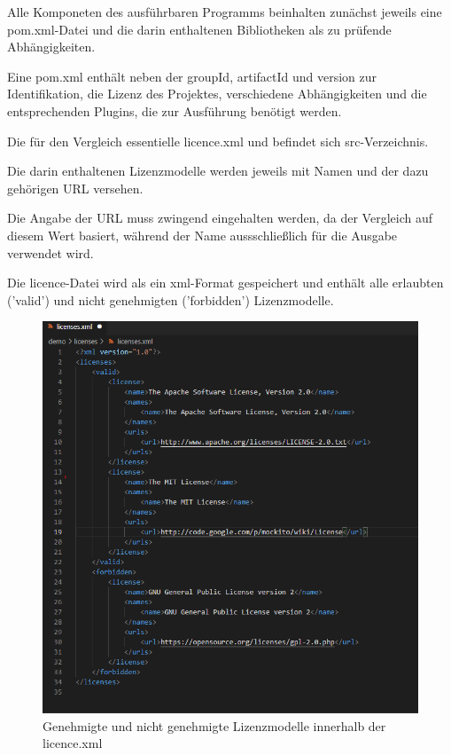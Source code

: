 Alle Komponeten des ausführbaren Programms beinhalten zunächst jeweils eine pom.xml-Datei und die darin enthaltenen Bibliotheken als zu prüfende Abhängigkeiten. 

Eine pom.xml enthält neben der groupId, artifactId und version zur Identifikation, die Lizenz des Projektes, verschiedene Abhängigkeiten und die entsprechenden Plugins, die zur Ausführung benötigt werden.  

Die für den Vergleich essentielle licence.xml und befindet sich src-Verzeichnis.  

Die darin enthaltenen Lizenzmodelle werden jeweils mit Namen und der dazu gehörigen URL versehen. 

Die Angabe der URL muss zwingend eingehalten werden, da der Vergleich auf diesem Wert basiert, während der Name aussschließlich für die Ausgabe verwendet wird.

Die licence-Datei wird als ein xml-Format gespeichert und enthält alle erlaubten ('valid') und nicht genehmigten ('forbidden') Lizenzmodelle. 

\begin{figure}[h]
    \centering
    \includegraphics[scale=0.45]{Bilder/licencesxml.png}
    \caption{Genehmigte und nicht genehmigte Lizenzmodelle innerhalb der licence.xml}
\end{figure}

